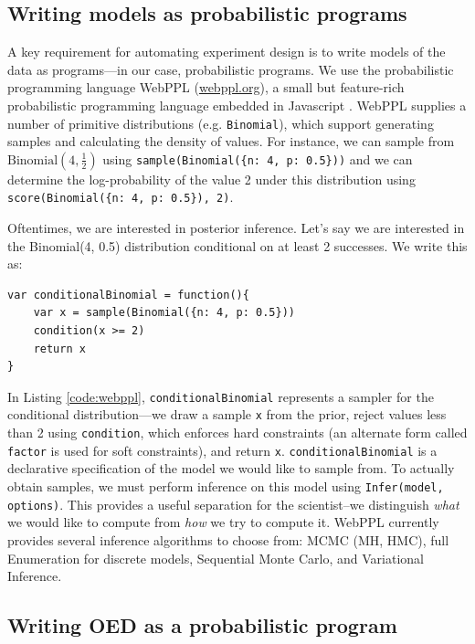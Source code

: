 \documentclass{article}
\begin{document}
\subsection{Writing models as probabilistic programs}

A key requirement for automating experiment design is to write models of the data as programs---in our case, probabilistic programs.
We use the probabilistic programming language WebPPL (\url{webppl.org}), a small but feature-rich probabilistic programming language embedded in Javascript \cite{dippl}.
WebPPL supplies a number of primitive distributions (e.g. \lstinline{Binomial}), which  support generating samples and calculating the density of values.
For instance, we can sample from $\text{Binomial}(4, \frac{1}{2})$ using \lstinline|sample(Binomial({n: 4, p: 0.5}))| and we can determine the log-probability of the value 2 under this distribution using \lstinline|score(Binomial({n: 4, p: 0.5}), 2)|.

Oftentimes, we are interested in posterior inference. Let's say we are interested in the Binomial(4, 0.5) distribution conditional on at least 2 successes. We write this as:
%
\begin{lstlisting}[mathescape, label={code:webppl}, caption = {Posterior inference in WebPPL.}]
var conditionalBinomial = function(){
	var x = sample(Binomial({n: 4, p: 0.5}))
	condition(x >= 2)
	return x
}
\end{lstlisting}

In Listing \ref{code:webppl}, \lstinline{conditionalBinomial} represents a sampler for the conditional distribution---we draw a sample \lstinline{x} from the prior, reject values less than 2 using \lstinline{condition}, which enforces hard constraints (an alternate form called \lstinline{factor} is used for soft constraints), and return \lstinline{x}.
\lstinline{conditionalBinomial} is a declarative specification of the model we would like to sample from.
To actually obtain samples, we must perform inference on this model using \lstinline{Infer(model, options)}.
This provides a useful separation for the scientist--we distinguish \emph{what} we would like to compute from \emph{how} we try to compute it.
WebPPL currently provides several inference algorithms to choose from: MCMC (MH, HMC), full Enumeration for discrete models, Sequential Monte Carlo, and Variational Inference.

\subsection{Writing OED as a probabilistic program}
\end{document}
